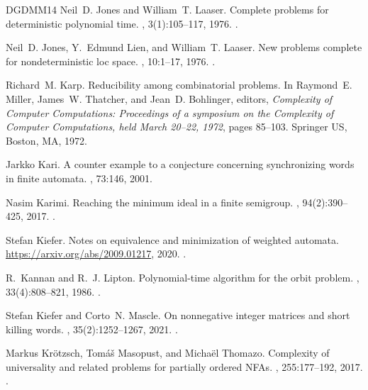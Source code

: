 \documentclass[11pt,a4paper]{amsart}
\theoremstyle{plain}
\theoremstyle{definition}
\theoremstyle{defC}
\theoremstyle{thmC}
\theoremstyle{plain}
\numberwithin{equation}{section}
\begin{document}
\begin{thebibliography}{DGDMM14}
Neil~D. Jones and William~T. Laaser.
\newblock Complete problems for deterministic polynomial time.
, 3(1):105--117, 1976.
\newblock \href {https://doi.org/10.1016/0304-3975(76)90068-2}
  {}.

Neil~D. Jones, Y.~Edmund Lien, and William~T. Laaser.
\newblock New problems complete for nondeterministic loc space.
, 10:1--17, 1976.
\newblock \href {https://doi.org/10.1007/BF01683259}
  {}.

Richard~M. Karp.
\newblock Reducibility among combinatorial problems.
\newblock In Raymond~E. Miller, James~W. Thatcher, and Jean~D. Bohlinger,
  editors, {\em Complexity of Computer Computations: Proceedings of a symposium
  on the Complexity of Computer Computations, held March 20--22, 1972}, pages
  85--103. Springer US, Boston, MA, 1972.

Jarkko Kari.
\newblock A counter example to a conjecture concerning synchronizing words in
  finite automata.
, 73:146, 2001.

Nasim Karimi.
\newblock Reaching the minimum ideal in a finite semigroup.
, 94(2):390--425, 2017.
\newblock \href {https://doi.org/10.1007/s00233-015-9770-9}
  {}.

Stefan Kiefer.
\newblock Notes on equivalence and minimization of weighted automata.
\newblock \url{https://arxiv.org/abs/2009.01217}, 2020.
\newblock \href {https://arxiv.org/abs/arXiv:2009.01217}
  {}.

R.~Kannan and R.~J. Lipton.
\newblock Polynomial-time algorithm for the orbit problem.
, 33(4):808--821, 1986.
\newblock \href {https://doi.org/10.1145/6490.6496}
  {}.

Stefan Kiefer and Corto~N. Mascle.
\newblock On nonnegative integer matrices and short killing words.
, 35(2):1252--1267, 2021.
\newblock \href {https://doi.org/10.1137/19M1250893}
  {}.

Markus Kr{\"{o}}tzsch, Tom{\'{a}}\v{s} Masopust, and Micha{\"{e}}l Thomazo.
\newblock Complexity of universality and related problems for partially ordered
  {NFAs}.
, 255:177--192, 2017.
\newblock \href {https://doi.org/10.1016/J.IC.2017.06.004}
  {}.


\end{thebibliography}
\end{document}

